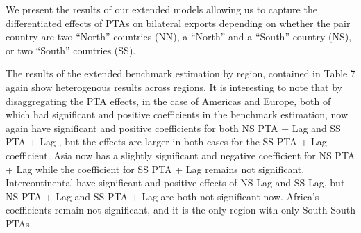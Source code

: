 We present the results of our extended models allowing us to capture the
differentiated effects of PTAs on bilateral exports depending on whether
the pair country are two ``North'' countries (NN), a ``North'' and a
``South'' country (NS), or two ``South'' countries (SS).

The results of the extended benchmark estimation by region, contained in
Table 7 again show heterogenous results across regions. It is
interesting to note that by disaggregating the PTA effects, in the case
of Americas and Europe, both of which had significant and positive
coefficients in the benchmark estimation, now again have significant and
positive coefficients for both NS PTA + Lag and SS PTA + Lag , but the
effects are larger in both cases for the SS PTA + Lag coefficient. Asia
now has a slightly significant and negative coefficient for NS PTA + Lag
while the coefficient for SS PTA + Lag remains not significant.
Intercontinental have significant and positive effects of NS Lag and SS
Lag, but NS PTA + Lag and SS PTA + Lag are both not significant now.
Africa's coefficients remain not significant, and it is the only region
with only South-South PTAs.
